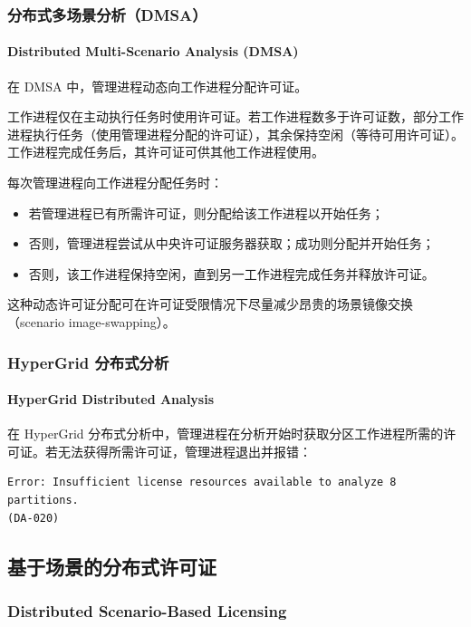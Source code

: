 \subsubsection{分布式多场景分析（DMSA）}
\paragraph*{Distributed Multi-Scenario Analysis (DMSA)}

在 DMSA 中，管理进程动态向工作进程分配许可证。

工作进程仅在主动执行任务时使用许可证。若工作进程数多于许可证数，部分工作进程执行任务（使用管理进程分配的许可证），其余保持空闲（等待可用许可证）。工作进程完成任务后，其许可证可供其他工作进程使用。

每次管理进程向工作进程分配任务时：
\begin{itemize}
  \item 若管理进程已有所需许可证，则分配给该工作进程以开始任务；
  \item 否则，管理进程尝试从中央许可证服务器获取；成功则分配并开始任务；
  \item 否则，该工作进程保持空闲，直到另一工作进程完成任务并释放许可证。
\end{itemize}

这种动态许可证分配可在许可证受限情况下尽量减少昂贵的场景镜像交换（scenario image-swapping）。

\subsubsection{HyperGrid 分布式分析}
\paragraph*{HyperGrid Distributed Analysis}

在 HyperGrid 分布式分析中，管理进程在分析开始时获取分区工作进程所需的许可证。若无法获得所需许可证，管理进程退出并报错：
\begin{lstlisting}
Error: Insufficient license resources available to analyze 8 partitions.
(DA-020)
\end{lstlisting}

\subsection{基于场景的分布式许可证}
\subsubsection*{Distributed Scenario-Based Licensing}


